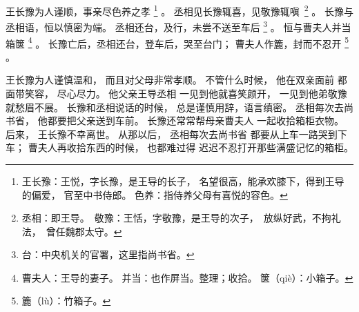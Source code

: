 
\switchcolumn*[\section{}]

王长豫为人谨顺，事亲尽色养之孝%
\footnote{%
    王长豫：王悦，字长豫，是王导的长子，
            名望很高，能承欢膝下，得到王导的偏爱，
            官至中书侍郎。
    色养：指侍养父母有喜悦的容色。
}%
。
丞相见长豫辄喜，见敬豫辄\mbox{嗔%
\footnote{%
    丞相：即王导。
    敬豫：王恬，字敬豫，是王导的次子，
          放纵好武，不拘礼法，
          曾任魏郡太守。
}}%
。
长豫与丞相语，恒以慎密为端。
丞相还台，及行，未尝不送至车后%
\footnote{%
    台：中央机关的官署，这里指尚书省。
}%
。
恒与曹夫人并当箱箧%
\footnote{%
    曹夫人：王导的妻子。
    并当：也作屏当。整理；收拾。
    箧（qiè）：小箱子。
}%
。
长豫亡后，丞相还台，登车后，哭至台门；
曹夫人作簏，封而不忍开%
\footnote{%
    簏（lù）：竹箱子。
}%
。

\switchcolumn

王长豫为人谨慎温和，
而且对父母非常孝顺。
不管什么时候，
他在双亲面前
都面带笑容，
尽心尽力。
他父亲王导丞相
  一见到他就喜笑颜开，
  一见到他弟敬豫就愁眉不展。
长豫和丞相说话的时候，
总是谨慎用辞，语言缜密。
丞相每次去尚书省，
他都要把父亲送到车前。
长豫还常常帮母亲曹夫人
一起收拾箱柜衣物。
后来，
王长豫不幸离世。
从那以后，
丞相每次去尚书省
都要从上车一路哭到下车；
曹夫人再收拾东西的时候，
也都难过得
迟迟不忍打开那些满盛记忆的箱柜。

